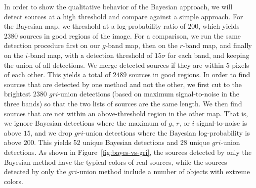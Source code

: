 \documentclass[11pt,letterpaper,linenumbers]{aastex7}
\newcommand{\figref}[1]{\mbox{Figure~\ref{#1}}}
\newcommand{\changed}[1]{#1}
\begin{document}
In order to show the \changed{qualitative behavior} of the Bayesian approach, we will
detect sources at a high threshold and compare against a simple
approach.  For the Bayesian map, we threshold at a log-probability
ratio of $200$, which yields $2380$ sources in good regions of the
image.  For a comparison, we run the same detection procedure first on
our $g$-band map, then on the $r$-band map, and finally on the
$i$-band map, with a detection threshold of $15 \sigma$ for each band,
and keeping the union of all detections.  We merge detected sources if
they are within 5 pixels of each other.  This yields a total of $2489$
sources in good regions.  In order to find sources that are detected
by one method and not the other, we first cut to the brightest $2380$
$gri$-union detections (based on maximum signal-to-noise in the three
bands) so that the two lists of sources are the same length.  We then
find sources that are not within an above-threshold region in the
other map.  That is, we ignore Bayesian detections where the maximum
of $g$, $r$, or $i$ signal-to-noise is above $15$, and we drop
$gri$-union detections where the Bayesian log-probability is above
$200$.  This yields 52 unique Bayesian detections and 28 unique
$gri$-union detections.  As shown in \figref{fig:bayes-vs-gri},
the sources detected by only the Bayesian method
have the typical colors of real sources, while the sources detected by
only the $gri$-union method include a number of objects with extreme colors.
\end{document}
